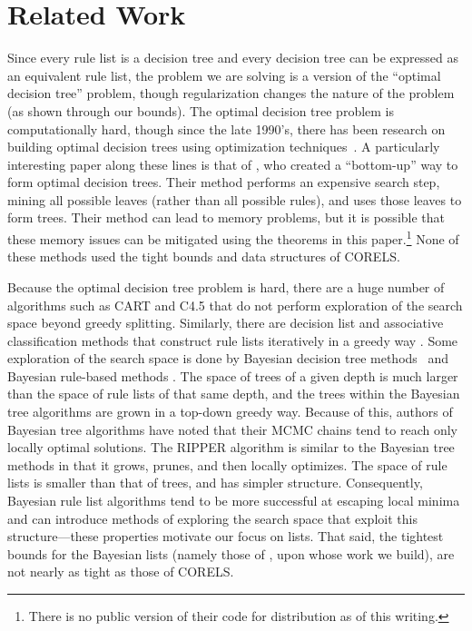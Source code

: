 \section{Related Work}

Since every rule list is a decision tree and every decision tree can be expressed as an equivalent rule list, the problem we are solving is a version of the ``optimal decision tree'' problem, though regularization changes the nature of the problem (as shown through our bounds). The optimal decision tree problem is computationally hard, though since the late 1990's, there has been research on building optimal decision trees using optimization techniques~\citep{Bennett96optimaldecision,dobkininduction,FarhangfarGZ08}. A particularly interesting paper along these lines is that of \citet{NijssenFromont2010}, who created a ``bottom-up'' way to form optimal decision trees. Their method performs an expensive search step, mining all possible leaves (rather than all possible rules), and uses those leaves to form trees. Their method can lead to memory problems, but it is possible that these memory issues can be mitigated using the theorems in this paper.\footnote{There is no public version of their code for distribution as of this writing.} None of these methods used the tight bounds and data structures of CORELS.

Because the optimal decision tree problem is hard, there are a huge number of algorithms such as CART \citep{Breiman84} and C4.5 \citep{Quinlan93} that do not perform exploration of the search space beyond greedy splitting. Similarly, there are decision list and associative classification methods that construct rule lists iteratively in a greedy way
\citep{Rivest87,Liu98,Li01,Yin03,Sokolova03,Marchand05,Vanhoof10,RudinLeMa13}.
Some exploration of the search space is done by Bayesian decision tree methods~\citep{Dension:1998hl,Chipman:2002hc,Chipman10} and Bayesian rule-based methods \citep{LethamRuMcMa15,YangRuSe16}. The space of trees of a given depth is much larger than the space of
rule lists of that same depth, and the trees within the Bayesian tree algorithms
are grown in a top-down greedy way. Because of this, authors of Bayesian tree algorithms have noted that their MCMC chains tend to reach only locally optimal solutions. 
The RIPPER algorithm \citep{ripper} is similar to the Bayesian tree methods in that it grows, prunes, and then locally optimizes.
%
The space of rule lists is smaller than that of trees, and has simpler structure.
%
Consequently, Bayesian rule list algorithms tend to be more successful at
escaping local minima and can introduce methods of exploring the search space
that exploit this structure---these properties motivate our focus on lists.
%
That said, the tightest bounds for the Bayesian lists (namely those of \citet{YangRuSe16},
upon whose work we build), are not nearly as tight as those of CORELS.

